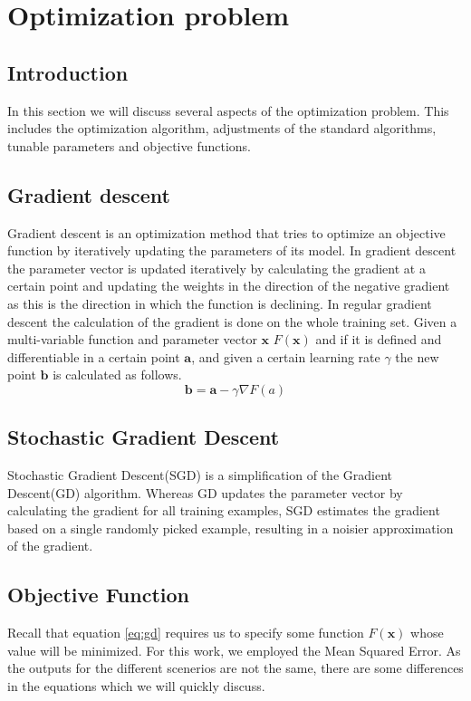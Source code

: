 \section{Optimization problem}
\subsection{Introduction}
In this section we will discuss several aspects of the optimization problem. This includes the optimization algorithm, adjustments of the standard algorithms, tunable parameters and objective functions.
\subsection{Gradient descent}%
Gradient descent is an optimization method that tries to optimize an objective function by iteratively updating the parameters of its model.
In gradient descent the parameter vector is updated iteratively by calculating the gradient at a certain point and updating the weights in the direction of the negative gradient as this is the direction in which the function is declining. 
In regular gradient descent the calculation of the gradient is done on the whole training set. Given a multi-variable function and parameter vector $\mathbf{x}$
$F(\mathbf{x})$ and if it is defined and differentiable in a certain point $\mathbf{a}$, and given a
certain learning rate $\gamma$  the new point $\mathbf{b}$ is calculated as follows.
\begin{equation} \label{eq:gd}
 \mathbf{b} = \mathbf{a} - \gamma \nabla F(a)
\end{equation}
 \subsection{Stochastic Gradient Descent} 
 Stochastic Gradient Descent(SGD) is a simplification of the Gradient Descent(GD) algorithm. Whereas GD updates the parameter vector by calculating the gradient for all training examples, SGD estimates
 the gradient based on a single randomly picked example, resulting in a noisier approximation of the gradient.
  
 \subsection{Objective Function}\label{section:obj}
 Recall that equation \ref{eq:gd} requires us to specify some function $F(\mathbf{x})$ whose value will be minimized. For this work, we employed the Mean Squared Error. As the outputs for the different scenerios
 are not the same, there are some differences in the equations which we will quickly discuss.
